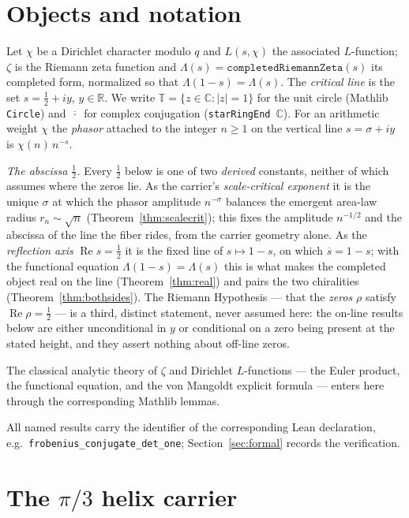 \documentclass[11pt]{article}
\DeclareMathOperator{\Ree}{Re}
\newcommand{\C}{\mathbb{C}}
\newcommand{\R}{\mathbb{R}}
\newcommand{\T}{\mathbb{T}}
\newcommand{\conj}[1]{\overline{#1}}
\newcommand{\code}[1]{\texttt{#1}}
\begin{document}
\section{Objects and notation}\label{sec:notation}

Let $\chi$ be a Dirichlet character modulo $q$ and $L(s,\chi)$ the associated $L$-function;
$\zeta$ is the Riemann zeta function and $\Lambda(s)=\code{completedRiemannZeta}(s)$ its completed
form, normalized so that $\Lambda(1-s)=\Lambda(s)$. The \emph{critical line} is the set
$s=\tfrac12+iy$, $y\in\R$. We write $\T=\{z\in\C:|z|=1\}$ for the unit circle (Mathlib
\code{Circle}) and $\conj{\,\cdot\,}$ for complex conjugation (\code{starRingEnd}~$\C$). For an
arithmetic weight $\chi$ the \emph{phasor} attached to the integer $n\ge 1$ on the vertical line
$s=\sigma+iy$ is $\chi(n)\,n^{-s}$.

\medskip
\noindent\emph{The abscissa $\tfrac12$.} Every $\tfrac12$ below is one of two \emph{derived}
constants, neither of which assumes where the zeros lie. As the carrier's \emph{scale-critical
exponent} it is the unique $\sigma$ at which the phasor amplitude $n^{-\sigma}$ balances the emergent
area-law radius $r_n\sim\sqrt n$ (Theorem~\ref{thm:scalecrit}); this fixes the amplitude $n^{-1/2}$
and the abscissa of the line the fiber rides, from the carrier geometry alone. As the \emph{reflection
axis} $\Ree s=\tfrac12$ it is the fixed line of $s\mapsto 1-s$, on which $\conj s=1-s$; with the
functional equation $\Lambda(1-s)=\Lambda(s)$ this is what makes the completed object real on the line
(Theorem~\ref{thm:real}) and pairs the two chiralities (Theorem~\ref{thm:bothsides}). The Riemann
Hypothesis --- that the \emph{zeros} $\rho$ satisfy $\Ree\rho=\tfrac12$ --- is a third, distinct
statement, never assumed here: the on-line results below are either unconditional in $y$ or
conditional on a zero being present at the stated height, and they assert nothing about off-line
zeros.

The classical analytic theory of $\zeta$ and Dirichlet $L$-functions --- the Euler product, the
functional equation, and the von Mangoldt explicit formula
\cite{Riemann1859,Edwards1974,Titchmarsh1986,Davenport2000,IwaniecKowalski2004,MontgomeryVaughan2007}
--- enters here through the corresponding Mathlib lemmas.

All named results carry the identifier of the corresponding Lean declaration, e.g.\
\code{frobenius\_conjugate\_det\_one}; Section~\ref{sec:formal} records the verification.

\section{The $\pi/3$ helix carrier}\label{sec:carrier}
\end{document}
